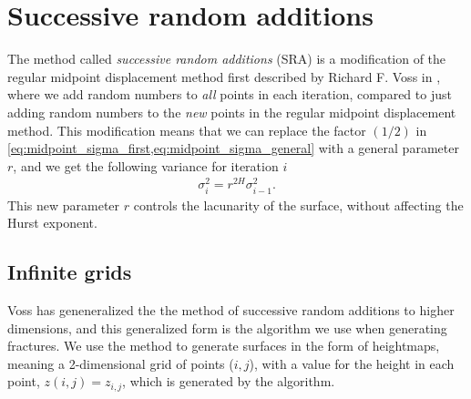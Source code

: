 \section{Successive random additions}
The method called \emph{successive random additions} (SRA) is a modification of the regular midpoint displacement method first described by Richard F. Voss in \cite{voss1985random}, where we add random numbers to \emph{all} points in each iteration, compared to just adding random numbers to the \emph{new} points in the regular midpoint displacement method. This modification means that we can replace the factor $(1/2)$ in \cref{eq:midpoint_sigma_first,eq:midpoint_sigma_general} with a general parameter $r$, and we get the following variance for iteration $i$
\begin{align*}
    \sigma_i^2 = r^{2H}\sigma^2_{i-1}.
\end{align*}
This new parameter $r$ controls the lacunarity of the surface, without affecting the Hurst exponent.

\subsection{Infinite grids}
Voss has geneneralized the the method of successive random additions to higher dimensions\cite{voss1985random}, and this generalized form is the algorithm we use when generating fractures. We use the method to generate surfaces in the form of heightmaps, meaning a 2-dimensional grid of points ({$i,j$}), with a value for the height in each point, $z(i,j) = z_{i,j}$, which is generated by the algorithm.

